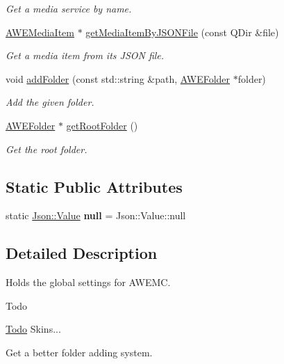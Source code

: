 \begin{DoxyCompactItemize}
\begin{DoxyCompactList}\small\item\em Get a media service by name. \end{DoxyCompactList}\item 
\hyperlink{class_a_w_e_media_item}{A\-W\-E\-Media\-Item} $\ast$ \hyperlink{class_a_w_e_global_settings_a94593f3ffc15a9380246e143c35aff62}{get\-Media\-Item\-By\-J\-S\-O\-N\-File} (const Q\-Dir \&file)
\begin{DoxyCompactList}\small\item\em Get a media item from its J\-S\-O\-N file. \end{DoxyCompactList}\item 
void \hyperlink{class_a_w_e_global_settings_abbc5e65701dd584536d738e2b55625a5}{add\-Folder} (const std\-::string \&path, \hyperlink{class_a_w_e_folder}{A\-W\-E\-Folder} $\ast$folder)
\begin{DoxyCompactList}\small\item\em Add the given folder. \end{DoxyCompactList}\item 
\hyperlink{class_a_w_e_folder}{A\-W\-E\-Folder} $\ast$ \hyperlink{class_a_w_e_global_settings_adb16b50f7386d2876fc130b0215bc5ed}{get\-Root\-Folder} ()
\begin{DoxyCompactList}\small\item\em Get the root folder. \end{DoxyCompactList}\end{DoxyCompactItemize}
\subsection*{Static Public Attributes}
\begin{DoxyCompactItemize}
\item 
\hypertarget{class_a_w_e_global_settings_aee4b93fba246350f468d72bb69acbccd}{static \hyperlink{class_json_1_1_value}{Json\-::\-Value} {\bfseries null} = Json\-::\-Value\-::null}\label{class_a_w_e_global_settings_aee4b93fba246350f468d72bb69acbccd}

\end{DoxyCompactItemize}


\subsection{Detailed Description}
Holds the global settings for A\-W\-E\-M\-C. 

\begin{DoxyRefDesc}{Todo}
\item[\hyperlink{todo__todo000006}{Todo}]Skins... 

Get a better folder adding system.\end{DoxyRefDesc}


